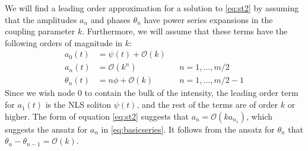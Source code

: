 \documentclass[11pt,reqno]{amsart}
\begin{document}
We will find a leading order approximation for a solution to \cref{eq:st2} by assuming that the amplitudes $a_n$ and phases $\theta_n$ have power series expansions in the coupling parameter $k$. Furthermore, we will assume that these terms have the following orders of magnitude in $k$:
\begin{equation}\label{eq:basicseries}
\begin{aligned}
a_0(t) &= \psi(t) + \mathcal{O}(k) \\
a_n(t) &= \mathcal{O}(k^n) && n = 1, \dots, m/2 \\
\theta_n(t) &= n \phi + \mathcal{O}(k) && n = 1, \dots, m/2-1
\end{aligned}
\end{equation}
Since we wish node 0 to contain the bulk of the intensity, the leading order term for $a_1(t)$ is the NLS soliton $\psi(t)$, and the rest of the terms are of order $k$ or higher. The form of equation \cref{eq:st2} suggests that $a_n = \mathcal{O}(k a_{n_1})$, which suggests the ansatz for $a_n$ in \cref{eq:basicseries}. It follows from the ansatz for $\theta_n$ that $\theta_n - \theta_{n-1} = \mathcal{O}(k)$.
\end{document}
